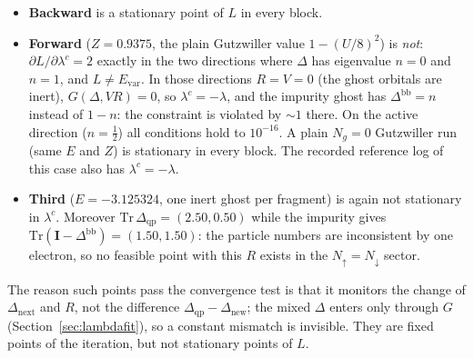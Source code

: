\documentclass[11pt]{article}
\newcommand{\Ng}{N_{g}}
\begin{document}
\begin{itemize}
  \item \textbf{Backward} is a stationary point of $L$ in every block.
  \item \textbf{Forward} ($Z=0.9375$, the plain Gutzwiller value $1-(U/8)^2$)
    is \emph{not}: $\partial L/\partial\lambda^{c}=2$ exactly in the two directions where
    $\Delta$ has eigenvalue $n=0$ and $n=1$, and $L\neq E_{\mathrm{var}}$. In those
    directions $R=V=0$ (the ghost orbitals are inert), $G(\Delta,VR)=0$, so
    $\lambda^{c}=-\lambda$, and the impurity ghost has $\Delta^{\mathrm{bb}}=n$ instead of
    $1-n$: the constraint is violated by $\sim1$ there. On the active
    direction ($n=\tfrac12$) all conditions hold to $10^{-16}$. A plain $\Ng=0$
    Gutzwiller run (same $E$ and $Z$) is stationary in every block. The recorded
    reference log of this case also has $\lambda^{c}=-\lambda$.
  \item \textbf{Third} ($E=-3.125324$, one inert ghost per fragment) is again
    not stationary in $\lambda^{c}$. Moreover $\mathrm{Tr}\,\Delta_{\mathrm{qp}}=(2.50,0.50)$
    while the impurity gives $\mathrm{Tr}(\mathbf I-\Delta^{\mathrm{bb}})=(1.50,1.50)$: the
    particle numbers are inconsistent by one electron, so no feasible point with
    this $R$ exists in the $N_\uparrow=N_\downarrow$ sector.
\end{itemize}
The reason such points pass the convergence test is that it monitors the change of
$\Delta_{\mathrm{next}}$ and $R$, not the difference $\Delta_{\mathrm{qp}}-\Delta_{\mathrm{new}}$; the
mixed $\Delta$ enters only through $G$ (Section~\ref{sec:lambdafit}), so a
constant mismatch is invisible. They are fixed points of the iteration, but not
stationary points of $L$.
\end{document}
